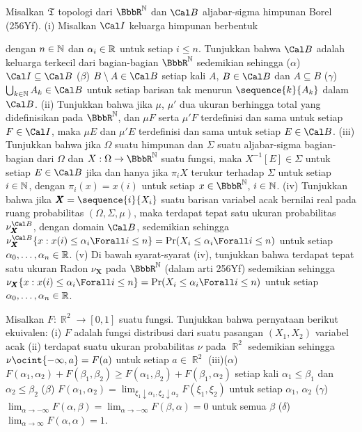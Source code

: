 {
Misalkan $\frak T$ topologi dari
$\BbbR^{\Bbb N}$ dan $\Cal B$ aljabar-sigma himpunan Borel (256Yf).
(i) Misalkan $\Cal I$ keluarga himpunan berbentuk


\noindent dengan $n\in\Bbb N$ dan $\alpha_i\in\Bbb R$
untuk setiap $i\le n$. Tunjukkan bahwa $\Cal B$ adalah keluarga terkecil
dari bagian-bagian $\BbbR^{\Bbb N}$ sedemikian sehingga ($\alpha$)
$\Cal I\subseteq\Cal B$
($\beta$) $B\setminus A\in\Cal B$ setiap kali $A$, $B\in\Cal B$ dan
$A\subseteq B$ ($\gamma$) $\bigcup_{k\in\Bbb N}A_k\in\Cal B$ untuk setiap
barisan tak menurun $\sequence{k}{A_k}$ dalam $\Cal B$. (ii) Tunjukkan bahwa
jika $\mu$, $\mu'$ dua ukuran berhingga total yang didefinisikan pada
$\BbbR^{\Bbb N}$, dan
$\mu F$ serta $\mu' F$ terdefinisi dan sama untuk setiap $F\in\Cal I$, maka
$\mu E$ dan $\mu' E$ terdefinisi dan sama untuk setiap $E\in\Cal B$.
(iii) Tunjukkan bahwa jika $\Omega$ suatu himpunan dan $\Sigma$ suatu
aljabar-sigma bagian-bagian dari $\Omega$ dan
$X:\Omega\to\BbbR^{\Bbb N}$ suatu fungsi, maka $X^{-1}[E]\in\Sigma$ untuk
setiap $E\in\Cal B$ jika dan hanya jika $\pi_iX$ terukur terhadap $\Sigma$
untuk setiap $i\in \Bbb N$, dengan $\pi_i(x)=x(i)$ untuk setiap
$x\in\BbbR^{\Bbb N}$, $i\in \Bbb N$. (iv) Tunjukkan bahwa jika
$\pmb{X}=\sequence{i}{X_i}$ suatu barisan variabel acak bernilai real pada ruang
probabilitas $(\Omega,\Sigma,\mu)$, maka terdapat tepat satu ukuran
probabilitas $\nu_{\pmb{X}}^{\Cal B}$, dengan domain $\Cal B$, sedemikian
sehingga
$\nu_{\pmb{X}}^{\Cal B}\{x:x(i)\le\alpha_i\Forall i\le n\}
=\Pr(X_i\le\alpha_i\Forall i\le n)$ untuk setiap
$\alpha_0,\ldots,\alpha_n\in\Bbb R$. (v) Di bawah syarat-syarat (iv),
tunjukkan bahwa terdapat tepat satu ukuran Radon $\nu_{\pmb{X}}$ pada
$\BbbR^{\Bbb N}$ (dalam arti 256Yf) sedemikian sehingga
$\nu_{\pmb{X}}\{x:x(i)\le\alpha_i\Forall i\le n\}
=\Pr(X_i\le\alpha_i\Forall i\le n)$ untuk setiap
$\alpha_0,\ldots,\alpha_n\in\Bbb R$.

 Misalkan $F:\BbbR^2\to[0,1]$ suatu fungsi.
Tunjukkan bahwa pernyataan berikut ekuivalen: (i) $F$ adalah fungsi distribusi
dari suatu pasangan $(X_1,X_2)$ variabel acak (ii) terdapat suatu ukuran
probabilitas $\nu$ pada $\BbbR^2$ sedemikian sehingga
$\nu\ocint{-\infty,a}=F(a)$ untuk setiap $a\in\BbbR^2$
(iii)($\alpha$)
$F(\alpha_1,\alpha_2)+F(\beta_1,\beta_2)
\ge F(\alpha_1,\beta_2)+F(\beta_1,\alpha_2)$ setiap kali
$\alpha_1\le\beta_1$
dan $\alpha_2\le\beta_2$ ($\beta$) $F(\alpha_1,\alpha_2)
=\lim_{\xi_1\downarrow\alpha_1,\xi_2\downarrow\alpha_2}F(\xi_1,\xi_2)$
untuk setiap $\alpha_1$, $\alpha_2$ ($\gamma$)
$\lim_{\alpha\to-\infty}F(\alpha,\beta)
=\lim_{\alpha\to-\infty}F(\beta,\alpha)=0$ untuk semua $\beta$
($\delta$) $\lim_{\alpha\to\infty}F(\alpha,\alpha)=1$.

}
